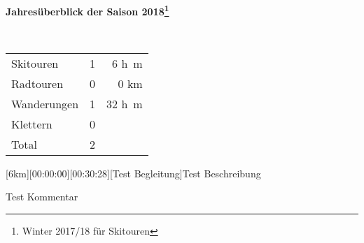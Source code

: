 \begin{center}{\Large \textbf{Jahres\"uberblick der Saison 2018\footnote{Winter 2017/18 f\"ur Skitouren}}} 

~

\begin{tabular}{lrr}
Skitouren & 1 & 6 \si{h\meter}\\
Radtouren & 0 & 0 \si{\kilo\meter}\\
Wanderungen & 1 & 32 \si{h\meter}\\
Klettern & 0&\\\hline
Total & 2 &
\end{tabular}\end{center}\newpage 
\begin{minipage}{\textwidth}[6km][00:00:00][00:30:28][Test Begleitung]\label{2018-05-04-Test 2}Test Beschreibung










 Test Kommentar









\end{minipage}
